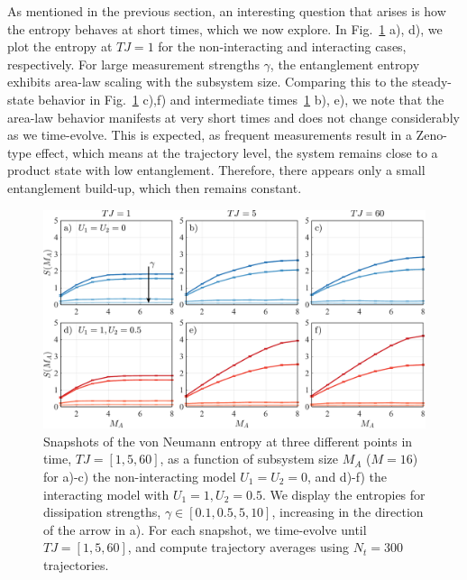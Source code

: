 As mentioned in the previous section, an interesting question that arises is how the entropy behaves at short times, which we now explore. In Fig.~\ref{fig:Chapter5_Fig1} a), d), we plot the entropy at $TJ = 1$ for the non-interacting and interacting cases, respectively. For large measurement strengths $\gamma$, the entanglement entropy exhibits area-law scaling with the subsystem size. Comparing this to the steady-state behavior in Fig.~\ref{fig:Chapter5_Fig1} c),f) and intermediate times~\ref{fig:Chapter5_Fig1} b), e), we note that the area-law behavior manifests at very short times and does not change considerably as we time-evolve. This is expected, as frequent measurements result in a Zeno-type effect, which means at the trajectory level, the system remains close to a product state with low entanglement. Therefore, there appears only a small entanglement build-up, which then remains constant. 
\begin{figure}[ht]
    \centering
    \includegraphics[width=\textwidth]{Chapters/Plots/Chapter6/Chapter5_Fig1.pdf}
    \caption{Snapshots of the von Neumann entropy at three different points in time, $TJ  = [1, 5, 60]$, as a function of subsystem size $M_A$ ($M=16$) for a)-c) the non-interacting model $U_1 = U_2 = 0$, and d)-f) the interacting model with $U_1 = 1, U_2 = 0.5$. We display the entropies for dissipation strengths, $\gamma \in [0.1,0.5,5,10]$, increasing in the direction of the arrow in a). For each snapshot, we time-evolve until $TJ = [1, 5, 60]$, and compute trajectory averages using $N_t = 300$ trajectories.}
    \label{fig:Chapter5_Fig1}
\end{figure}
